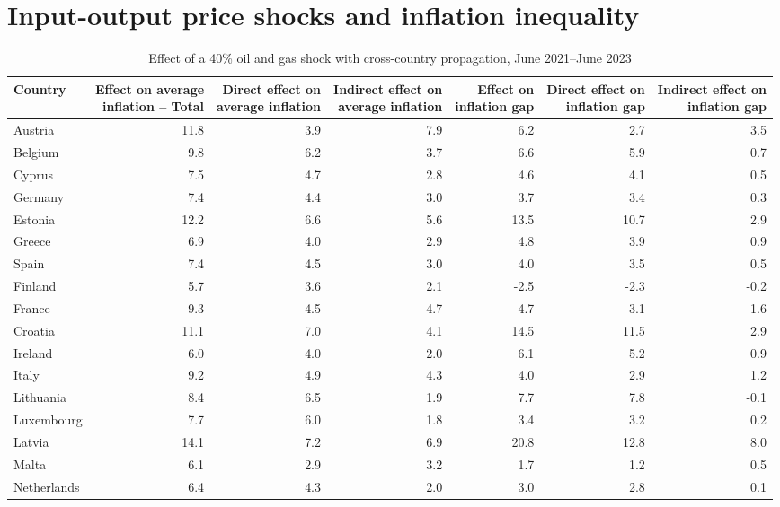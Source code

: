 \documentclass[11pt]{article}
\begin{document}
\section*{Input-output price shocks and inflation inequality}
\begin{table}[H]
\centering
\caption{Effect of a 40\% oil and gas shock with cross-country propagation, June 2021--June 2023}
\label{tab:shock-oil-gas-chain-ea20}
\scriptsize
\setlength{\tabcolsep}{1.2pt}
\begin{tabular}{lrrrrrr}
\toprule
Country & \shortstack{Effect on average\\inflation -- Total} & \shortstack{Direct effect on\\average inflation} & \shortstack{Indirect effect on\\average inflation} & \shortstack{Effect on\\inflation gap} & \shortstack{Direct effect on\\inflation gap} & \shortstack{Indirect effect on\\inflation gap}
 \\
\midrule
Austria & 11.8 & 3.9 & 7.9 & 6.2 & 2.7 & 3.5
 \\
Belgium & 9.8 & 6.2 & 3.7 & 6.6 & 5.9 & 0.7
 \\
Cyprus & 7.5 & 4.7 & 2.8 & 4.6 & 4.1 & 0.5
 \\
Germany & 7.4 & 4.4 & 3.0 & 3.7 & 3.4 & 0.3
 \\
Estonia & 12.2 & 6.6 & 5.6 & 13.5 & 10.7 & 2.9
 \\
Greece & 6.9 & 4.0 & 2.9 & 4.8 & 3.9 & 0.9
 \\
Spain & 7.4 & 4.5 & 3.0 & 4.0 & 3.5 & 0.5
 \\
Finland & 5.7 & 3.6 & 2.1 & -2.5 & -2.3 & -0.2
 \\
France & 9.3 & 4.5 & 4.7 & 4.7 & 3.1 & 1.6
 \\
Croatia & 11.1 & 7.0 & 4.1 & 14.5 & 11.5 & 2.9
 \\
Ireland & 6.0 & 4.0 & 2.0 & 6.1 & 5.2 & 0.9
 \\
Italy & 9.2 & 4.9 & 4.3 & 4.0 & 2.9 & 1.2
 \\
Lithuania & 8.4 & 6.5 & 1.9 & 7.7 & 7.8 & -0.1
 \\
Luxembourg & 7.7 & 6.0 & 1.8 & 3.4 & 3.2 & 0.2
 \\
Latvia & 14.1 & 7.2 & 6.9 & 20.8 & 12.8 & 8.0
 \\
Malta & 6.1 & 2.9 & 3.2 & 1.7 & 1.2 & 0.5
 \\
Netherlands & 6.4 & 4.3 & 2.0 & 3.0 & 2.8 & 0.1

\end{tabular}
\end{table}
\end{document}
